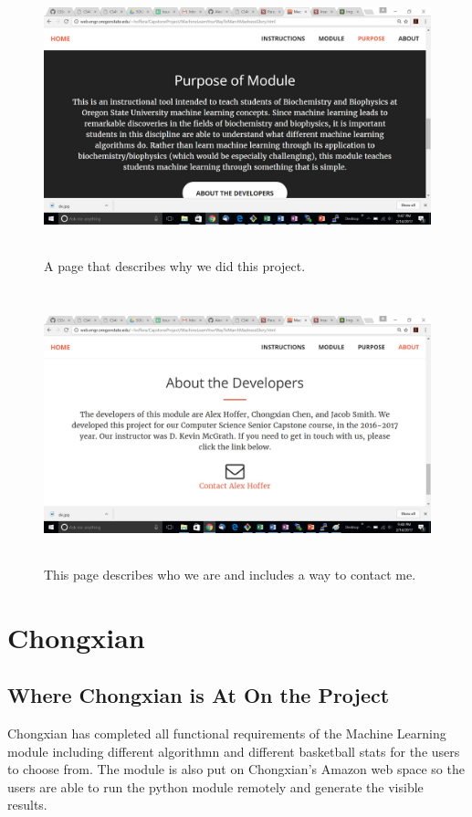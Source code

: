 \documentclass[onecolumn, draftclsnofoot,10pt, compsoc]{IEEEtran}
\begin{document}
\begin{figure}[H]
\centering
\includegraphics[width=500px, height=300px]{images/Purpose}
\caption{A page that describes why we did this project.}
\label{fig4}
\end{figure}

\begin{figure}[H]
\centering
\includegraphics[width=500px, height=300px]{images/About}
\caption{This page describes who we are and includes a way to contact me.}
\label{fig5}
\end{figure}


\section{Chongxian}
\subsection{Where Chongxian is At On the Project}
Chongxian has completed all functional requirements of the Machine Learning module including different algorithmn and different basketball stats for the users to choose from. The module is also put on Chongxian's Amazon web space so the users are able to run the python module remotely and generate the visible results. 
\end{document}
